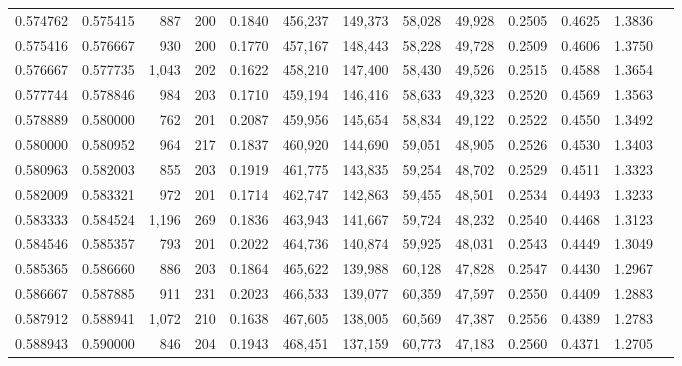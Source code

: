 \begin{tabular}{rrrrrrrrrrrrr}
0.574762 & 0.575415 &    887 &   200 &                                     0.1840 & 456,237 & 149,373 &  58,028 &  49,928 & 0.2505 & 0.4625 & 1.3836 \\
0.575416 & 0.576667 &    930 &   200 &                                     0.1770 & 457,167 & 148,443 &  58,228 &  49,728 & 0.2509 & 0.4606 & 1.3750 \\
0.576667 & 0.577735 &  1,043 &   202 &                                     0.1622 & 458,210 & 147,400 &  58,430 &  49,526 & 0.2515 & 0.4588 & 1.3654 \\
0.577744 & 0.578846 &    984 &   203 &                                     0.1710 & 459,194 & 146,416 &  58,633 &  49,323 & 0.2520 & 0.4569 & 1.3563 \\
0.578889 & 0.580000 &    762 &   201 &                                     0.2087 & 459,956 & 145,654 &  58,834 &  49,122 & 0.2522 & 0.4550 & 1.3492 \\
0.580000 & 0.580952 &    964 &   217 &                                     0.1837 & 460,920 & 144,690 &  59,051 &  48,905 & 0.2526 & 0.4530 & 1.3403 \\
0.580963 & 0.582003 &    855 &   203 &                                     0.1919 & 461,775 & 143,835 &  59,254 &  48,702 & 0.2529 & 0.4511 & 1.3323 \\
0.582009 & 0.583321 &    972 &   201 &                                     0.1714 & 462,747 & 142,863 &  59,455 &  48,501 & 0.2534 & 0.4493 & 1.3233 \\
0.583333 & 0.584524 &  1,196 &   269 &                                     0.1836 & 463,943 & 141,667 &  59,724 &  48,232 & 0.2540 & 0.4468 & 1.3123 \\
0.584546 & 0.585357 &    793 &   201 &                                     0.2022 & 464,736 & 140,874 &  59,925 &  48,031 & 0.2543 & 0.4449 & 1.3049 \\
0.585365 & 0.586660 &    886 &   203 &                                     0.1864 & 465,622 & 139,988 &  60,128 &  47,828 & 0.2547 & 0.4430 & 1.2967 \\
0.586667 & 0.587885 &    911 &   231 &                                     0.2023 & 466,533 & 139,077 &  60,359 &  47,597 & 0.2550 & 0.4409 & 1.2883 \\
0.587912 & 0.588941 &  1,072 &   210 &                                     0.1638 & 467,605 & 138,005 &  60,569 &  47,387 & 0.2556 & 0.4389 & 1.2783 \\
0.588943 & 0.590000 &    846 &   204 &                                     0.1943 & 468,451 & 137,159 &  60,773 &  47,183 & 0.2560 & 0.4371 & 1.2705 \\

\end{tabular}
